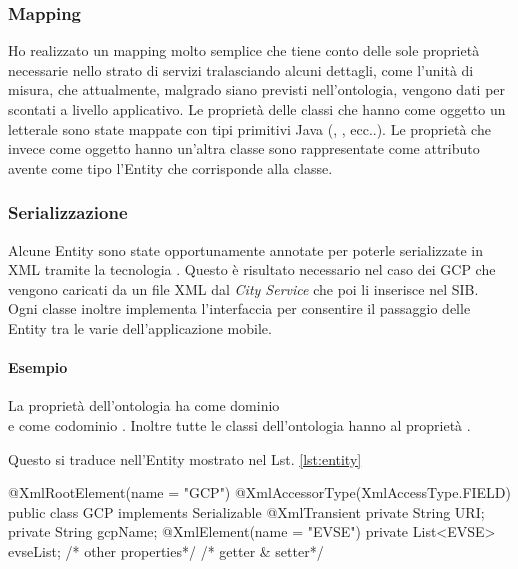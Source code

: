 \subsubsection{Mapping} 

Ho realizzato un mapping molto semplice che tiene conto delle sole proprietà necessarie nello strato di servizi 
 tralasciando alcuni dettagli, come l'unità di misura, che attualmente, malgrado siano previsti nell'ontologia, vengono dati per scontati a livello applicativo.
Le proprietà delle classi che hanno come oggetto un letterale sono state mappate con tipi primitivi Java (,  ,  ecc..). Le proprietà che invece come oggetto hanno un'altra classe sono rappresentate come attributo avente come tipo l'Entity che corrisponde alla classe. 

\subsubsection{Serializzazione} 

Alcune Entity sono state opportunamente annotate per poterle serializzate in XML tramite la tecnologia . Questo è risultato necessario nel caso dei GCP che vengono caricati da un file XML dal \emph{City Service} che poi li inserisce nel SIB. Ogni classe inoltre implementa l'interfaccia  per consentire il passaggio delle Entity tra le varie  dell'applicazione mobile.

\paragraph{Esempio}

La proprietà dell'ontologia  ha come dominio \\  e come codominio . Inoltre tutte le classi dell'ontologia hanno al proprietà .

Questo si traduce nell'Entity mostrato nel Lst. \ref{lst:entity}

\begin{java}[caption={Entity di esempio},label={lst:entity}]
@XmlRootElement(name = "GCP")
@XmlAccessorType(XmlAccessType.FIELD)
public class GCP implements Serializable {
	@XmlTransient
	private String URI;
	private String gcpName;
	@XmlElement(name = "EVSE")
	private List<EVSE> evseList;
	/* other properties*/
	/* getter & setter*/	
}
\end{java}

